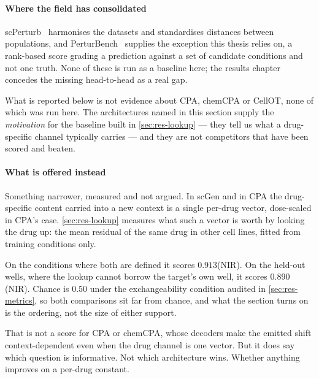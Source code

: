 \paragraph{Where the field has consolidated}
scPerturb~\cite{scperturb} harmonises the datasets and standardises distances
between populations, and PerturBench~\cite{perturbench} supplies the
exception this thesis relies on, a rank-based score grading a prediction against
a set of candidate conditions and not one truth. None of these is run as a
baseline here; the results chapter concedes the missing head-to-head as a real
gap.

\begin{scopelimit}
What is reported below is not evidence about CPA, chemCPA or CellOT, none of
which was run here. The architectures named in this section supply the
\emph{motivation} for the baseline built in \cref{sec:res-lookup} --- they tell
us what a drug-specific channel typically carries --- and they are not
competitors that have been scored and beaten.
\end{scopelimit}

\paragraph{What is offered instead} Something narrower, measured and not argued.
In scGen and in CPA the drug-specific content carried into a new context is a
single per-drug vector, dose-scaled in CPA's case. \cref{sec:res-lookup}
measures what such a vector is worth by looking the drug up: the mean residual of
the same drug in other cell lines, fitted from training conditions
only.

On the conditions where both are defined it scores $0.913$(NIR). On the held-out wells, where the lookup cannot
borrow the target's own well, it scores $0.890$(NIR). Chance is $0.50$ under the
exchangeability condition audited in \cref{sec:res-metrics}, so both comparisons
sit far from chance, and what the section turns
on is the ordering, not the size of either support.

That is not a score for CPA or chemCPA, whose decoders make the emitted shift
context-dependent even when the drug channel is one vector. But it does say which
question is informative. Not which architecture wins. Whether anything improves
on a per-drug constant.


